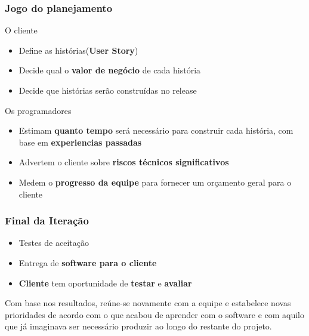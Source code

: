 \documentclass[10pt]{beamer}
\begin{document}
\begin{frame}
  \frametitle{Jogo do planejamento}
    \begin{block}{O cliente}
      \begin{itemize}%
        \item Define as histórias(\textbf{User Story})
        \item Decide qual o \textbf{valor de negócio} de cada história
        \item Decide que histórias serão construídas no release
      \end{itemize}
    \end{block}
    \pause
    \begin{block}{Os programadores}
      \begin{itemize}%
        \item Estimam \textbf{quanto tempo} será necessário para construir cada história, com base em \textbf{experiencias passadas}
        \item Advertem o cliente sobre \textbf{riscos técnicos significativos}
        \item Medem o \textbf{progresso da equipe} para fornecer um orçamento geral para o cliente
      \end{itemize}
    \end{block}
\end{frame}


\begin{frame}
  \frametitle{Final da Iteração}
  \begin{itemize}%
    \item Testes de aceitação
    \item Entrega de \textbf{software para o cliente}
    \item \textbf{Cliente} tem oportunidade de \textbf{testar} e \textbf{avaliar}
  \end{itemize}
  \begin{block}{}
Com base nos resultados, reúne-se novamente com a equipe e estabelece novas prioridades de acordo com o que acabou de aprender com o software e com aquilo que já imaginava ser necessário produzir ao longo do restante do projeto.
  \end{block}
\end{frame}
\end{document}

